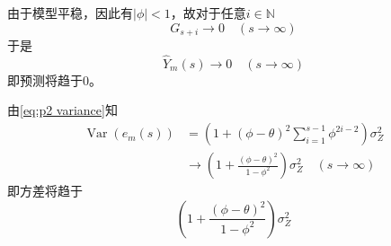 \documentclass[cn]{homework}
\DeclareMathOperator{\var}{Var}
\begin{document}
\begin{subproblem}[(\alph*)]
        \item
        由于模型平稳，因此有$|\phi|<1$，故对于任意$i\in\mathbb N$
        \[G_{s+i}\to 0\quad(s\to\infty)\]
        于是
        \[\hat Y_m(s)\to 0\quad(s\to\infty)\]
        即预测将趋于0。

        \item
        由\cref{eq:p2 variance}知
        \[\begin{aligned}
            \var(e_m(s))
            &=\left(1+(\phi-\theta)^2\sum_{i=1}^{s-1}\phi^{2i-2}\right)\sigma_Z^2\\
            &\to\left(1+\frac{(\phi-\theta)^2}{1-\phi^2}\right)\sigma_Z^2
             \quad(s\to\infty)
        \end{aligned}\]
        即方差将趋于
        \[\left(1+\frac{(\phi-\theta)^2}{1-\phi^2}\right)\sigma_Z^2\]
    \end{subproblem}
\end{document}
